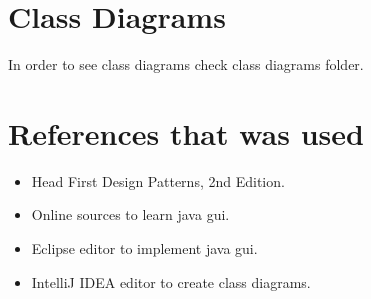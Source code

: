 \documentclass{article}
\begin{document}
\section{Class Diagrams}
In order to see class diagrams check class diagrams folder. 
\section{References that was used} 
\begin{itemize}
	\item Head First Design Patterns, 2nd Edition.
	\item Online sources to learn java gui.
	\item Eclipse editor to implement java gui.
	\item IntelliJ IDEA editor to create class diagrams.
\end{itemize}

   
\end{document}

